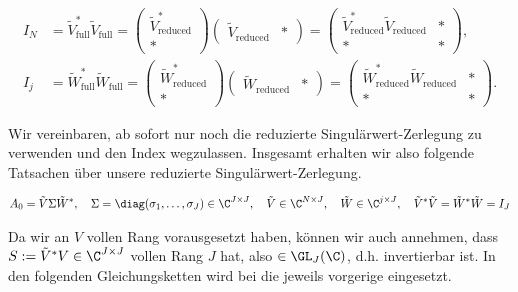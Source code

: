 \begin{align*}
    I_N
    & =
    \tilde V_\mathrm{full}^\ast \tilde V_\mathrm{full}
    =
    \begin{pmatrix}
        \tilde V_\mathrm{reduced}^\ast \\ \ast
    \end{pmatrix}
    \begin{pmatrix}
        \tilde V_\mathrm{reduced} & \ast
    \end{pmatrix}
    =
    \begin{pmatrix}
        \tilde V_\mathrm{reduced}^\ast \tilde V_\mathrm{reduced} & \ast \\
        \ast                                                     & \ast
    \end{pmatrix}, \\
    I_j
    & =
    \tilde W_\mathrm{full}^\ast \tilde W_\mathrm{full}
    =
    \begin{pmatrix}
        \tilde W_\mathrm{reduced}^\ast \\ \ast
    \end{pmatrix}
    \begin{pmatrix}
        \tilde W_\mathrm{reduced} & \ast
    \end{pmatrix}
    =
    \begin{pmatrix}
        \tilde W_\mathrm{reduced}^\ast \tilde W_\mathrm{reduced} & \ast \\
        \ast                                                     & \ast
    \end{pmatrix}.
\end{align*}

Wir vereinbaren, ab sofort nur noch die reduzierte Singulärwert-Zerlegung zu verwenden und den Index wegzulassen.
Insgesamt erhalten wir also folgende Tatsachen über unsere reduzierte Singulärwert-Zerlegung.

\begin{align} \label{eq:singulärwert_zerlegung}
    A_0 = \tilde V \Sigma \tilde W^\ast,
    \quad
    \Sigma = \diag(\sigma_1, \dots, \sigma_J) \in \C^{J \times J},
    \quad
    \tilde V \in \C^{N \times J},
    \quad
    \tilde W \in \C^{j \times J},
    \quad
    \tilde V^\ast \tilde V
    =
    \tilde W^\ast \tilde W
    =
    I_J
\end{align}

Da wir an $V$ vollen Rang vorausgesetzt haben, können wir auch annehmen, dass $S := \tilde V^\ast V \in \C^{J \times J}$ vollen Rang $J$ hat, also $\in \GL_J(\C)$, d.h. invertierbar ist.
In den folgenden Gleichungsketten wird bei \Quote{!} die jeweils vorgerige eingesetzt.

